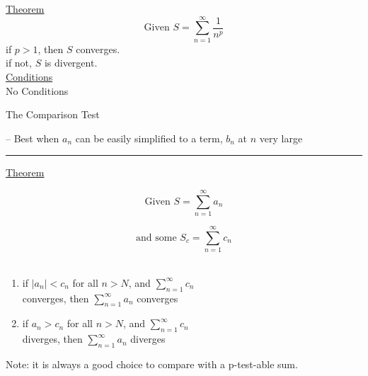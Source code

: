 \documentclass{article}
\begin{document}
\begin{multicols}{2}
\begin{center}
    \underline{Theorem}
    \medskip
    \[
         \textrm{Given } S = \sum_{n = 1}^\infty{\frac{1}{n^p}}
    \]
    if $p > 1$, then $S$ converges.\\\smallskip
    if not, $S$ is divergent.
    \\
    \vfill\null\columnbreak
    \underline{Conditions}
    \\\bigskip
    No Conditions
    \end{center}
\end{multicols}

\begin{large}
    The Comparison Test
\end{large} -- Best when $a_n$ can be easily simplified to a term, $b_n$ at $n$ very large\\
\noindent\rule{\textwidth}{0.5pt}
\begin{center}
\underline{Theorem}

\begin{multicols}{2}\noindent
    \[
         \textrm{Given } S = \sum_{n = 1}^\infty{a_n}
    \]
    
    \[
         \textrm{and some } S_c = \sum_{n = 1}^\infty{c_n}
    \]
    \\
    \vfill\null\columnbreak
    
    \begin{enumerate}
        \item if $|a_n| < c_n$ for all $n > N$, and $\sum_{n=1}^\infty{c_n}$\\ converges, then $\sum_{n = 1}^\infty{a_n}$ converges
        \item if $a_n > c_n$ for all $n > N$, and $\sum_{n=1}^\infty{c_n}$\\ diverges, then $\sum_{n = 1}^\infty{a_n}$ diverges
    \end{enumerate}
    
    \noindent Note: it is always a good choice to compare with a p-test-able sum.
    
\end{multicols}
\end{center}
\end{document}
